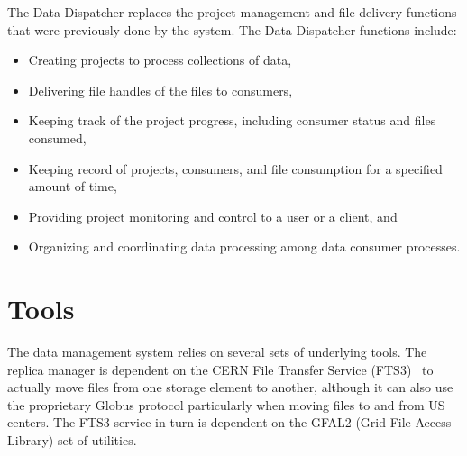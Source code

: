 \documentclass[../main-v1.tex]{subfiles}
\begin{document}
The Data Dispatcher replaces the project management and file delivery functions that were previously done by the  system.  The Data Dispatcher functions include:
\begin{itemize}
    \item Creating projects to process collections of data,
    
    \item Delivering file handles of the files to consumers,
    
    \item Keeping track of the project progress, including consumer status and files consumed,
    
    \item Keeping record of projects, consumers, and file consumption for a specified amount of time,
    
    \item Providing project monitoring and control to a user or a client, and
    
    \item Organizing and coordinating data processing among data consumer processes.

\end{itemize}



\section{Tools }

The data management system relies on several sets of underlying tools.  The  replica manager is dependent on the CERN File Transfer Service (FTS3)~\cite{Kiryanov:2015fts} to actually move files from one storage element to another, although it can also use the proprietary
Globus protocol 
particularly when moving files to and from US  centers.  The FTS3 service in turn is dependent on the
GFAL2 (Grid File Access Library) set of utilities.
\end{document}
